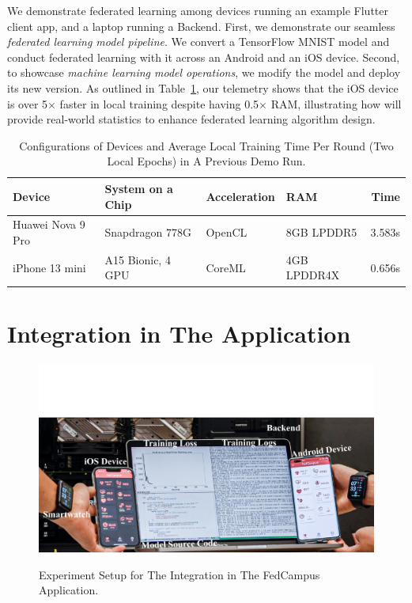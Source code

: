 We demonstrate federated learning among
devices running an example Flutter client app,
and a laptop running a \fedkit Backend.
First, we demonstrate our seamless \textit{federated learning model pipeline}.
We convert a TensorFlow MNIST model and
conduct federated learning with it across an Android and an iOS device.
Second, to showcase \textit{machine learning model operations},
we modify the model and deploy its new version.
As outlined in Table~\ref{tbl:demo-stats},
our telemetry shows that
the iOS device is over 5$\times$ faster in local training despite
having 0.5$\times$ RAM,
illustrating how \fedkit will provide real-world statistics to
enhance federated learning algorithm design.

\begin{table}
    \centering
    \setlength{\tabcolsep}{4pt}
    \begin{tabular}{llllr}
        Device            & System on a Chip  & Acceleration & RAM         & Time   \\\hline
        Huawei Nova 9 Pro & Snapdragon 778G   & OpenCL       & 8GB LPDDR5  & 3.583s \\
        iPhone 13 mini    & A15 Bionic, 4 GPU & CoreML       & 4GB LPDDR4X & 0.656s \\
    \end{tabular}
    \caption{Configurations of Devices and Average Local Training Time Per Round
        (Two Local Epochs) in A Previous Demo Run.
    }
    \label{tbl:demo-stats}
\end{table}

\section{\fedkit Integration in The \fedcampus Application}

\begin{figure}\begin{center}
        \label{fig:integration}
        \includegraphics[width=\linewidth]{fedcampus.pdf}
        \caption{Experiment Setup for The \fedkit Integration in The FedCampus
            Application.
        }
    \end{center}\end{figure}

